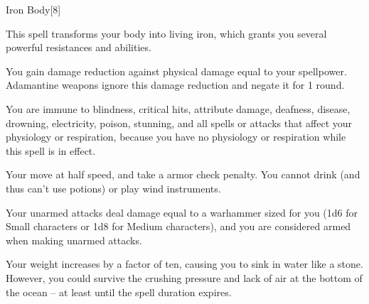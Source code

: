 \begin{spellsection}{Iron Body}[8]
    \begin{spellheader}
    \end{spellheader}
    \begin{spellcontent}
        \begin{spelltargetinginfo}
        \end{spelltargetinginfo}
        \begin{spelleffects}
            \spelleffect This spell transforms your body into living iron, which grants you several powerful resistances and abilities.
            \par You gain damage reduction against physical damage equal to your spellpower. Adamantine weapons ignore this damage reduction and negate it for 1 round.
            \par You are immune to blindness, critical hits, attribute damage, deafness, disease, drowning, electricity, poison, stunning, and all spells or attacks that affect your physiology or respiration, because you have no physiology or respiration while this spell is in effect.
            \par Your move at half speed, and take a  armor check penalty. You cannot drink (and thus can't use potions) or play wind instruments.
            \par Your unarmed attacks deal damage equal to a warhammer sized for you (1d6 for Small characters or 1d8 for Medium characters), and you are considered armed when making unarmed attacks.
            \par Your weight increases by a factor of ten, causing you to sink in water like a stone. However, you could survive the crushing pressure and lack of air at the bottom of the ocean -- at least until the spell duration expires.
            \spelldur \durshort \dismissable
        \end{spelleffects}
    \end{spellcontent}
    \begin{spellfooter}
        \miscastexplode
    \end{spellfooter}
\end{spellsection}

